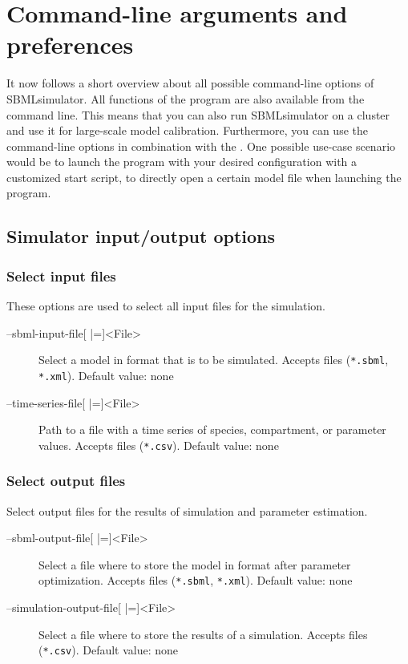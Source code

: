 \chapter{Command-line arguments and preferences}
\label{chap:CMD}

It now follows a short overview about all possible command-line options of SBMLsimulator.
All functions of the program are also available from the command line.
This means that you can also run SBMLsimulator on a cluster and use it for large-scale model calibration.
Furthermore, you can use the command-line options in combination with the \GUI.
One possible use-case scenario would be to launch the program with your desired configuration with a customized start script, \eg to directly open a certain model file when launching the program.


\renewcommand{\descriptionlabel}[1]{\textcolor{blue}{\texttt{#1}}}

\section{Simulator input/output options}
\subsection{Select input files}
These options are used to select all input files for the simulation.
\begin{description}
\item[--sbml-input-file{[} |={]}<File>]
          Select a model in \SBML format that is to be simulated. Accepts
          \SBML files (\texttt{*.sbml}, \texttt{*.xml}).
          Default value: none
\item[--time-series-file{[} |={]}<File>] Path to a file with a time series of
          species, compartment, or parameter
          values. Accepts \CSV files (\texttt{*.csv}).
          Default value: none
\end{description}

\subsection{Select output files}
Select output files for the results of simulation and parameter estimation.
\begin{description}
\item[--sbml-output-file{[} |={]}<File>]
          Select a file where to store the model in \SBML format after parameter
          optimization. Accepts \SBML files (\texttt{*.sbml}, \texttt{*.xml}).
          Default value: none

\item[--simulation-output-file{[} |={]}<File>]
          Select a file where to store the results of a simulation. Accepts
          \CSV files (\texttt{*.csv}).
          Default value: none
\end{description}

